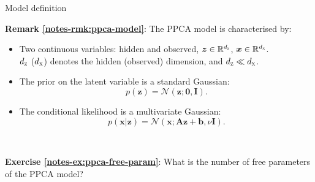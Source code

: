 \documentclass{beamer}
\newcommand{\bs}[1]{\boldsymbol{#1}}
\newcommand{\exercise}[2]{\noindent\colorbox{blue!10}{\parbox{0.995\textwidth}{\textbf{Exercise \ref{notes-ex:#1}}: #2}}\\}
\newcommand{\remark}[2]{\noindent\colorbox{red!10}{\parbox{0.995\textwidth}{\textbf{Remark \ref{notes-rmk:#1}}: #2}}\\}
\begin{document}
\begin{frame}{Model definition}
\remark{ppca-model}{The PPCA model is characterised by:
\begin{itemize}
 \item Two continuous variables: hidden and observed, $\bs{z}\in\mathbb{R}^{d_{\textsc{z}}}$, $\bs{x}\in\mathbb{R}^{d_{\textsc{x}}}$.\\ $d_{\textsc{z}}$ ($d_{\textsc{x}}$) denotes the hidden (observed) dimension, and $d_{\textsc{z}} \ll d_{\textsc{x}}$.
 \item The prior on the latent variable is a standard Gaussian:
 \[
  p(\bs{z}) = \mathcal{N}(\bs{z};\bs{0},\bs{I}).
 \]
 \item The conditional likelihood is a multivariate Gaussian:
 \[
  p(\bs{x}|\bs{z}) = \mathcal{N}(\bs{x};\bs{A}\bs{z}+\bs{b},\nu\bs{I}).
 \]
\end{itemize}}\pause\vspace{3mm}
\exercise{ppca-free-param}{What is the number of free parameters of the PPCA model?}
\end{frame}
\end{document}

